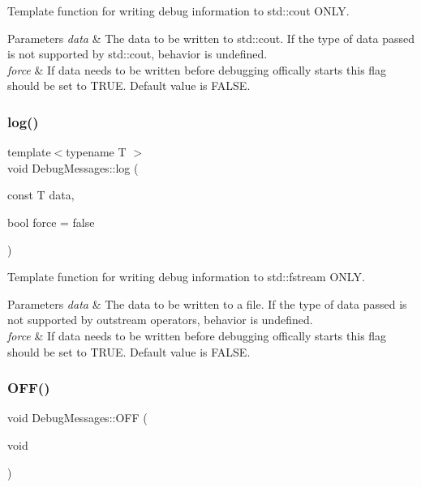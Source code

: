 Template function for writing debug information to std\+::cout O\+N\+LY.


\begin{DoxyParams}{Parameters}
{\em data} & The data to be written to std\+::cout. If the type of data passed is not supported by std\+::cout, behavior is undefined.\\
\hline
{\em force} & If data needs to be written before debugging offically starts this flag should be set to T\+R\+UE. Default value is F\+A\+L\+SE. \\
\hline
\end{DoxyParams}
\mbox{\label{classDebugMessages_a6b7e8eb509b3d0903e918ae25dec18aa}} 
\subsubsection{\texorpdfstring{log()}{log()}}
{\footnotesize\ttfamily template$<$typename T $>$ \\
void Debug\+Messages\+::log (\begin{DoxyParamCaption}\item[{const T}]{data,  }\item[{bool}]{force = {\ttfamily false} }\end{DoxyParamCaption})\hspace{0.3cm}{\ttfamily [inline]}}

Template function for writing debug information to std\+::fstream O\+N\+LY.


\begin{DoxyParams}{Parameters}
{\em data} & The data to be written to a file. If the type of data passed is not supported by outstream operators, behavior is undefined.\\
\hline
{\em force} & If data needs to be written before debugging offically starts this flag should be set to T\+R\+UE. Default value is F\+A\+L\+SE. \\
\hline
\end{DoxyParams}
\mbox{\label{classDebugMessages_ac1e4085ade0d1ff7b603fd8205f74b7c}} 
\subsubsection{\texorpdfstring{O\+F\+F()}{OFF()}}
{\footnotesize\ttfamily void Debug\+Messages\+::\+O\+FF (\begin{DoxyParamCaption}\item[{void}]{ }\end{DoxyParamCaption})\hspace{0.3cm}{\ttfamily [inline]}}

